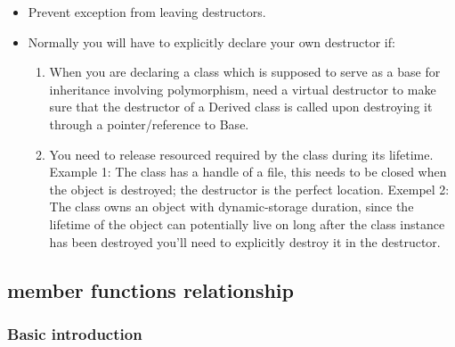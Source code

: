 \documentclass[a4paper,11pt,twoside]{book}
\begin{document}
\begin{itemize}
	\item Prevent exception from leaving destructors.
	
	\item Normally you will have to explicitly declare your own destructor if:

	\begin{enumerate}
		\item When you are declaring a class which is supposed to serve as a base for inheritance involving polymorphism, need a virtual destructor to make sure that the destructor of a Derived class is called upon destroying it through a pointer/reference to Base.
		
		\item You need to release resourced required by the class during its lifetime. Example 1: The class has a handle of a file, this needs to be closed when the object is destroyed; the destructor is the perfect location. Exempel 2: The class owns an object with dynamic-storage duration, since the lifetime of the object can potentially live on long after the class instance has been destroyed you'll need to explicitly destroy it in the destructor.
	\end{enumerate}
\end{itemize}

\subsection{member functions relationship}

\subsubsection{Basic introduction}
\end{document}
